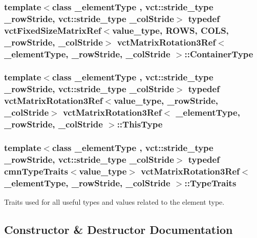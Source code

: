 \subsubsection[{Container\+Type}]{\setlength{\rightskip}{0pt plus 5cm}template$<$class \+\_\+element\+Type , vct\+::stride\+\_\+type \+\_\+row\+Stride, vct\+::stride\+\_\+type \+\_\+col\+Stride$>$ typedef {\bf vct\+Fixed\+Size\+Matrix\+Ref}$<$value\+\_\+type, {\bf R\+O\+W\+S}, {\bf C\+O\+L\+S}, \+\_\+row\+Stride, \+\_\+col\+Stride$>$ {\bf vct\+Matrix\+Rotation3\+Ref}$<$ \+\_\+element\+Type, \+\_\+row\+Stride, \+\_\+col\+Stride $>$\+::{\bf Container\+Type}}\label{classvct_matrix_rotation3_ref_acf072a6c67950bf0621787114bb016b4}
\hypertarget{classvct_matrix_rotation3_ref_aa4f99a97ebf5b94d4030335f45c91966}{}
\subsubsection[{This\+Type}]{\setlength{\rightskip}{0pt plus 5cm}template$<$class \+\_\+element\+Type , vct\+::stride\+\_\+type \+\_\+row\+Stride, vct\+::stride\+\_\+type \+\_\+col\+Stride$>$ typedef {\bf vct\+Matrix\+Rotation3\+Ref}$<$value\+\_\+type, \+\_\+row\+Stride, \+\_\+col\+Stride$>$ {\bf vct\+Matrix\+Rotation3\+Ref}$<$ \+\_\+element\+Type, \+\_\+row\+Stride, \+\_\+col\+Stride $>$\+::{\bf This\+Type}}\label{classvct_matrix_rotation3_ref_aa4f99a97ebf5b94d4030335f45c91966}
\hypertarget{classvct_matrix_rotation3_ref_a1627d01cd92c60b2a20b920593015948}{}
\subsubsection[{Type\+Traits}]{\setlength{\rightskip}{0pt plus 5cm}template$<$class \+\_\+element\+Type , vct\+::stride\+\_\+type \+\_\+row\+Stride, vct\+::stride\+\_\+type \+\_\+col\+Stride$>$ typedef {\bf cmn\+Type\+Traits}$<$value\+\_\+type$>$ {\bf vct\+Matrix\+Rotation3\+Ref}$<$ \+\_\+element\+Type, \+\_\+row\+Stride, \+\_\+col\+Stride $>$\+::{\bf Type\+Traits}}\label{classvct_matrix_rotation3_ref_a1627d01cd92c60b2a20b920593015948}
Traits used for all useful types and values related to the element type. 

\subsection{Constructor \& Destructor Documentation}
\hypertarget{classvct_matrix_rotation3_ref_a1a6432e931dbde0cafd5be068e4e239d}{}
